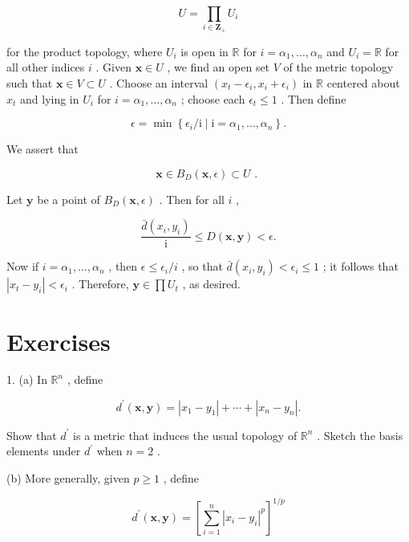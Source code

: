 \documentclass[10pt]{article}
\begin{document}
\[
U = \mathop{\prod }\limits_{{i \in  {\mathbf{Z}}_{ + }}}{U}_{i}
\]

for the product topology, where \({U}_{i}\) is open in \(\mathbb{R}\) for \(i = {\alpha }_{1},\ldots ,{\alpha }_{n}\) and \({U}_{i} = \mathbb{R}\) for all other indices \(i\) . Given \(\mathbf{x} \in  U\) , we find an open set \(V\) of the metric topology such that \(\mathbf{x} \in  V \subset  U\) . Choose an interval \(\left( {{x}_{t} - {\epsilon }_{i},{x}_{i} + {\epsilon }_{i}}\right)\) in \(\mathbb{R}\) centered about \({x}_{t}\) and lying in \({U}_{i}\) for \(i = {\alpha }_{1},\ldots ,{\alpha }_{n}\) ; choose each \({\epsilon }_{t} \leq  1\) . Then define

\[
\epsilon  = \min \left\{  {{\epsilon }_{i}/\mathrm{i} \mid  \mathrm{i} = {\alpha }_{1},\ldots ,{\alpha }_{n}}\right\}  .
\]

We assert that

\[
\mathbf{x} \in  {B}_{D}\left( {\mathbf{x},\epsilon }\right)  \subset  U\text{ . }
\]

Let \(\mathbf{y}\) be a point of \({B}_{D}\left( {\mathbf{x},\epsilon }\right)\) . Then for all \(i\) ,

\[
\frac{\bar{d}\left( {{x}_{i},{y}_{i}}\right) }{\mathrm{i}} \leq  D\left( {\mathbf{x},\mathbf{y}}\right)  < \epsilon .
\]

Now if \(i = {\alpha }_{1},\ldots ,{\alpha }_{n}\) , then \(\epsilon  \leq  {\epsilon }_{i}/i\) , so that \(\bar{d}\left( {{x}_{i},{y}_{i}}\right)  < {\epsilon }_{i} \leq  1\) ; it follows that \(\left| {{x}_{t} - {y}_{i}}\right|  < {\epsilon }_{i}\) . Therefore, \(\mathbf{y} \in  \prod {U}_{t}\) , as desired.

\section*{Exercises}

1. (a) In \({\mathbb{R}}^{n}\) , define

\[
{d}^{\prime }\left( {\mathbf{x},\mathbf{y}}\right)  = \left| {{x}_{1} - {y}_{1}}\right|  + \cdots  + \left| {{x}_{n} - {y}_{n}}\right| .
\]

Show that \({d}^{\prime }\) is a metric that induces the usual topology of \({\mathbb{R}}^{n}\) . Sketch the basis elements under \({d}^{\prime }\) when \(n = 2\) .

(b) More generally, given \(p \geq  1\) , define

\[
{d}^{\prime }\left( {\mathbf{x},\mathbf{y}}\right)  = {\left\lbrack  \mathop{\sum }\limits_{{i = 1}}^{n}{\left| {x}_{i} - {y}_{i}\right| }^{p}\right\rbrack  }^{1/p}
\]
\end{document}
